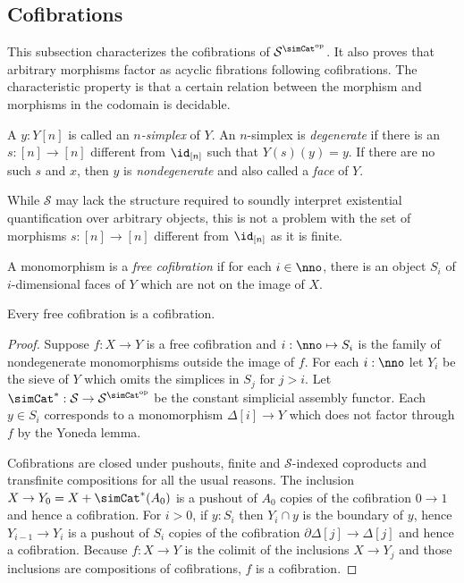 \documentclass{tac}
\newcommand\cat\mathcal
\newcommand\ri{^*}
\newcommand\dual{^{\mathrm{op}}}
\newcommand\s{^{\simCat\dual}}
\newcommand\of{:}
\newcommand\simplex\Delta
\newcommand\cycle{\partial\Delta}
\begin{document}
\subsection{Cofibrations}
This subsection characterizes the cofibrations of $\cat S\s$. It also proves that arbitrary morphisms factor as acyclic fibrations following cofibrations. The characteristic property is that a certain relation between the morphism and morphisms in the codomain is decidable.

\begin{definition} A $y\of Y[n]$ is called an \emph{$n$-simplex} of $Y$. An $n$-simplex is \emph{degenerate} if there is an $s\of [n]\to [n]$ different from $\id_{[n]}$ such that $Y(s)(y)=y$. If there are no such $s$ and $x$, then $y$ is \emph{nondegenerate} and also called a \emph{face} of $Y$.\end{definition}

While $\cat S$ may lack the structure required to soundly interpret existential quantification over arbitrary objects, this is not a problem with the set of morphisms $s\of [n]\to [n]$ different from $\id_{[n]}$ as it is finite.

\begin{definition} A monomorphism is a \emph{free cofibration} if for each $i\in \nno$, there is an object $S_i$ of $i$-dimensional faces of $Y$ which are not on the image of $X$.
\end{definition}

\begin{lemma} Every free cofibration is a cofibration. \label{Reedy}
\end{lemma}

\begin{proof} Suppose $f\of X\to Y$ is a free cofibration and $i\of\nno\mapsto S_i$ is the family of nondegenerate monomorphisms outside the image of $f$. 
For each $i\of\nno$ let $Y_i$ be the sieve of $Y$ which omits the simplices in $S_j$ for $j>i$.
Let $\simCat\ri\of \cat S\to\cat S\s$ be the constant simplicial assembly functor. 
Each $y\in S_i$ corresponds to a monomorphism $\simplex[i]\to Y$ which does not factor through $f$ by the Yoneda lemma.

Cofibrations are closed under pushouts, finite and $\cat S$-indexed coproducts and transfinite compositions for all the usual reasons.
The inclusion $X\to Y_0 = X+\simCat\ri(A_0)$ is a pushout of $A_0$ copies of the cofibration $0\to 1$ and hence a cofibration.
For $i>0$, if $y\of S_i$ then $Y_i\cap y$ is the boundary of $y$, hence $Y_{i-1}\to Y_i$ is a pushout of $S_i$ copies of the cofibration $\cycle[j]\to\simplex[j]$ and hence a cofibration. Because $f\of X\to Y$ is the colimit of the inclusions $X\to Y_j$ and those inclusions are compositions of cofibrations, $f$ is a cofibration.
\end{proof}
\end{document}
